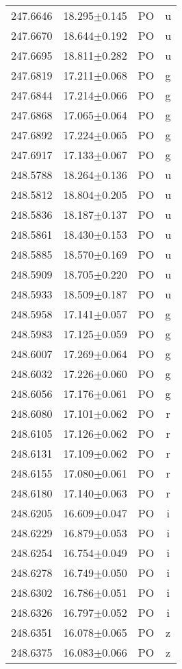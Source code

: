 \begin{table}
\begin{tabular}{cccc}
247.6646 & 18.295$\pm$0.145 & PO & u \\
247.6670 & 18.644$\pm$0.192 & PO & u \\
247.6695 & 18.811$\pm$0.282 & PO & u \\
247.6819 & 17.211$\pm$0.068 & PO & g \\
247.6844 & 17.214$\pm$0.066 & PO & g \\
247.6868 & 17.065$\pm$0.064 & PO & g \\
247.6892 & 17.224$\pm$0.065 & PO & g \\
247.6917 & 17.133$\pm$0.067 & PO & g \\
248.5788 & 18.264$\pm$0.136 & PO & u \\
248.5812 & 18.804$\pm$0.205 & PO & u \\
248.5836 & 18.187$\pm$0.137 & PO & u \\
248.5861 & 18.430$\pm$0.153 & PO & u \\
248.5885 & 18.570$\pm$0.169 & PO & u \\
248.5909 & 18.705$\pm$0.220 & PO & u \\
248.5933 & 18.509$\pm$0.187 & PO & u \\
248.5958 & 17.141$\pm$0.057 & PO & g \\
248.5983 & 17.125$\pm$0.059 & PO & g \\
248.6007 & 17.269$\pm$0.064 & PO & g \\
248.6032 & 17.226$\pm$0.060 & PO & g \\
248.6056 & 17.176$\pm$0.061 & PO & g \\
248.6080 & 17.101$\pm$0.062 & PO & r \\
248.6105 & 17.126$\pm$0.062 & PO & r \\
248.6131 & 17.109$\pm$0.062 & PO & r \\
248.6155 & 17.080$\pm$0.061 & PO & r \\
248.6180 & 17.140$\pm$0.063 & PO & r \\
248.6205 & 16.609$\pm$0.047 & PO & i \\
248.6229 & 16.879$\pm$0.053 & PO & i \\
248.6254 & 16.754$\pm$0.049 & PO & i \\
248.6278 & 16.749$\pm$0.050 & PO & i \\
248.6302 & 16.786$\pm$0.051 & PO & i \\
248.6326 & 16.797$\pm$0.052 & PO & i \\
248.6351 & 16.078$\pm$0.065 & PO & z \\
248.6375 & 16.083$\pm$0.066 & PO & z \\

\end{tabular}
\end{table}
